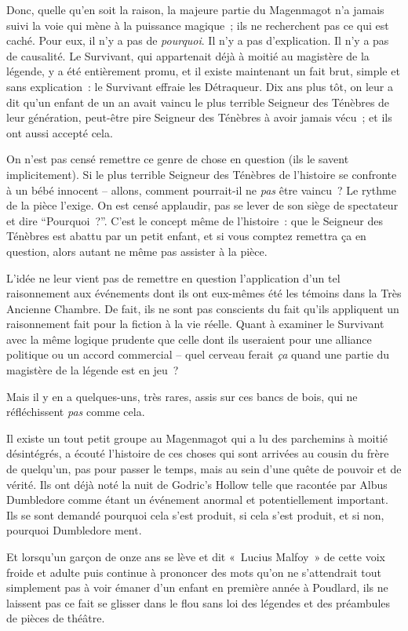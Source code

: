 Donc, quelle qu'en soit la raison, la majeure partie du Magenmagot n'a jamais suivi la voie qui mène à la puissance magique~; ils ne recherchent pas ce qui est caché. Pour eux, il n'y a pas de \emph{pourquoi}. Il n'y a pas d'explication. Il n'y a pas de causalité. Le Survivant, qui appartenait déjà à moitié au magistère de la légende, y a été entièrement promu, et il existe maintenant un fait brut, simple et sans explication~: le Survivant effraie les Détraqueur. Dix ans plus tôt, on leur a dit qu'un enfant de un an avait vaincu le plus terrible Seigneur des Ténèbres de leur génération, peut-être pire Seigneur des Ténèbres à avoir jamais vécu~; et ils ont aussi accepté cela.

On n'est pas censé remettre ce genre de chose en question (ils le savent implicitement). Si le plus terrible Seigneur des Ténèbres de l'histoire se confronte à un bébé innocent -- allons, comment pourrait-il ne \emph{pas} être vaincu~? Le rythme de la pièce l'exige. On est censé applaudir, pas se lever de son siège de spectateur et dire “Pourquoi~?”. C'est le concept même de l'histoire~: que le Seigneur des Ténèbres est abattu par un petit enfant, et si vous comptez remettra ça en question, alors autant ne même pas assister à la pièce.

L'idée ne leur vient pas de remettre en question l'application d'un tel raisonnement aux événements dont ils ont eux-mêmes été les témoins dans la Très Ancienne Chambre. De fait, ils ne sont pas conscients du fait qu'ils appliquent un raisonnement fait pour la fiction à la vie réelle. Quant à examiner le Survivant avec la même logique prudente que celle dont ils useraient pour une alliance politique ou un accord commercial -- quel cerveau ferait \emph{ça} quand une partie du magistère de la légende est en jeu~?

Mais il y en a quelques-uns, très rares, assis sur ces bancs de bois, qui ne réfléchissent \emph{pas} comme cela.

Il existe un tout petit groupe au Magenmagot qui a lu des parchemins à moitié désintégrés, a écouté l'histoire de ces choses qui sont arrivées au cousin du frère de quelqu'un, pas pour passer le temps, mais au sein d'une quête de pouvoir et de vérité. Ils ont déjà noté la nuit de Godric's Hollow telle que racontée par Albus Dumbledore comme étant un événement anormal et potentiellement important. Ils se sont demandé pourquoi cela s'est produit, si cela s'est produit, et si non, pourquoi Dumbledore ment.

Et lorsqu'un garçon de onze ans se lève et dit «~Lucius Malfoy~» de cette voix froide et adulte puis continue à prononcer des mots qu'on ne s'attendrait tout simplement pas à voir émaner d'un enfant en première année à Poudlard, ils ne laissent pas ce fait se glisser dans le flou sans loi des légendes et des préambules de pièces de théâtre.

